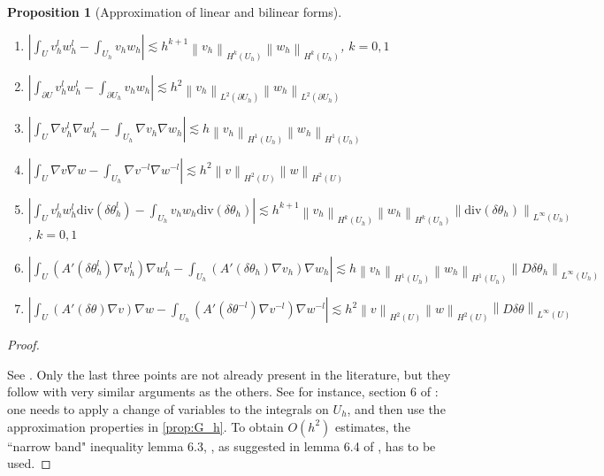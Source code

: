 \documentclass[english,a4paper,9pt,oneside]{scrbook}	%
\theoremstyle{break}
\newtheorem{prop}[equation]{Proposition}
\newenvironment{mproof}[1][\proofname]{%
  \begin{proof}[#1]$ $\par\nobreak\ignorespaces
}{%
  \end{proof}
}
\renewcommand*{\proofname}{Proof}
\theoremstyle{remark}
\newcommand{\ds}{\displaystyle}
\newcommand{\norm}[1]{\left\lVert#1\right\rVert}
\newcommand{\te}{\theta}
\newcommand{\dive}{\text{div}}
\begin{document}
\begin{appendices}
\begin{prop}[Approximation of linear and bilinear forms]
\begin{enumerate}
	\item $\ds \left | \int_U v_h^lw_h^l - \int_{U_h}v_hw_h\right |\lesssim h^{k+1} \norm{v_h}_{H^k(U_h)}\norm{w_h}_{H^k(U_h)}$, $k=0,1$
	\item $\ds \left | \int_{\partial U} v_h^lw_h^l - \int_{\partial U_h}v_hw_h\right |\lesssim h^2 \norm{v_h}_{L^2(\partial U_h)}\norm{w_h}_{L^2(\partial U_h)}$
	\item $\ds \left | \int_U \nabla v_h^l\nabla w_h^l - \int_{U_h}\nabla v_h\nabla w_h\right |\lesssim h \norm{v_h}_{H^1(U_h)}\norm{w_h}_{H^1(U_h)}$
	\item $\ds \left | \int_U \nabla v\nabla w - \int_{U_h}\nabla v^{-l}\nabla w^{-l}\right |\lesssim h^2 \norm{v}_{H^2(U)}\norm{w}_{H^2(U)}$
	\item $\ds \left | \int_U v_h^l w_h^l \dive(\delta  \te_h^l) - \int_{U_h}v_h w_h \dive(\delta \te_h)\right |\lesssim h^{k+1} \norm{v_h}_{H^k(U_h)}\norm{w_h}_{H^k(U_h)} \norm{\dive(\delta \te_h)}_{L^\infty(U_h)}$, $k=0,1$
	\item $\ds \left | \int_U (A'(\delta	\te_h^l)\nabla v_h^l)\nabla w_h^l - \int_{U_h}(A'(\delta	\te_h)\nabla v_h)\nabla w_h\right |\lesssim h \norm{v_h}_{H^1(U_h)}\norm{w_h}_{H^1(U_h)}\norm{D\delta \te_h}_{L^\infty(U_h)}$
	\item $\ds \left | \int_U (A'(\delta	\te)\nabla v)\nabla w - \int_{U_h}(A'(\delta	\te^{-l})\nabla v^{-l})\nabla w^{-l}\right |\lesssim h^2 \norm{v}_{H^2(U)}\norm{w}_{H^2(U)}\norm{D\delta \te}_{L^\infty(U)}$
\end{enumerate}
\end{prop}

\begin{mproof}
See \cite{edelmann}. Only the last three points are not already present in the literature, but they follow with very similar arguments as the others. See for instance, section 6 of \cite{elliott}: one needs to apply a change of variables to the integrals on $U_h$, and then use the approximation properties in \cref{prop:G_h}. To obtain $O(h^2)$ estimates, the ``narrow band" inequality lemma 6.3, \cite{elliott}, as suggested in  lemma 6.4 of \cite{elliott}, has to be used.


\end{mproof}
\end{appendices}
\end{document}

